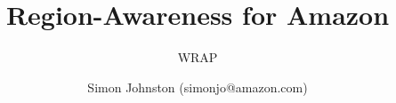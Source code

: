 \newcommand*{\acrlike}[1]{\textsc{\lowercase{#1}}}
\newcommand*{\iacrlike}[1]{\index{#1}\acrlike{#1}}
	
\newcommand{\indexas}[1]{\index{#1}#1}
\newcommand{\indexaslc}[1]{\index{#1}\lowercase{#1}}


\usepackage[acronym,toc]{glossaries}
\makeglossaries


\usepackage{makeidx}
\makeindex

\title{Region-Awareness for Amazon}
\subtitle{\acrlong{WRAP}}
\author{Simon Johnston (simonjo@amazon.com)}
